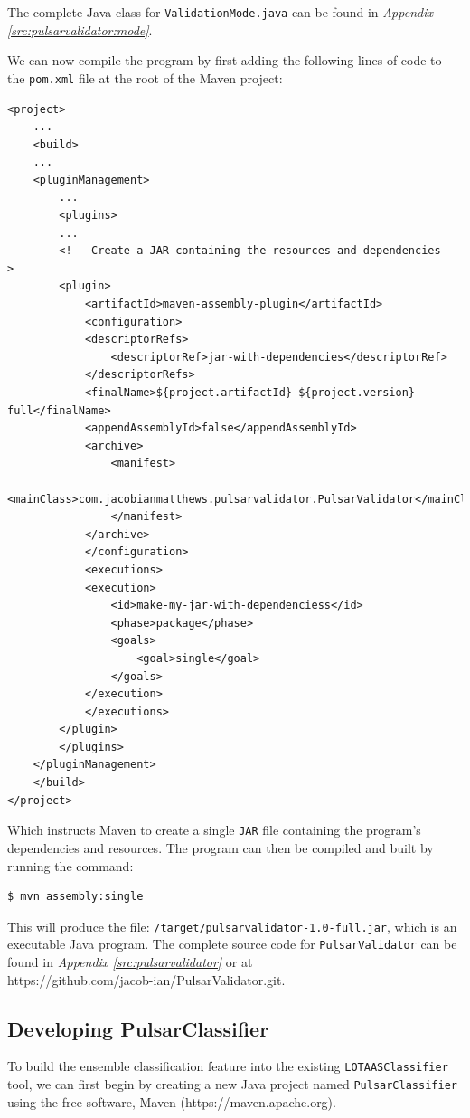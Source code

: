 \documentclass{article}
\begin{document}
\begin{appendices}
\begin{subappendices}
        The complete Java class for \verb|ValidationMode.java| can be found in \emph{Appendix \ref{src:pulsarvalidator:mode}}.
        
        We can now compile the program by first adding the following lines of code to the \verb|pom.xml| file at the root of the Maven project:
        
        \begin{lstlisting}[numbers=none, title=pom.xml]
<project>
    ...
    <build>
    ...
    <pluginManagement>
        ...
        <plugins>
        ...
        <!-- Create a JAR containing the resources and dependencies -->
        <plugin>
            <artifactId>maven-assembly-plugin</artifactId>
            <configuration>
            <descriptorRefs>
                <descriptorRef>jar-with-dependencies</descriptorRef>
            </descriptorRefs>
            <finalName>${project.artifactId}-${project.version}-full</finalName>
            <appendAssemblyId>false</appendAssemblyId>
            <archive>
                <manifest>
                <mainClass>com.jacobianmatthews.pulsarvalidator.PulsarValidator</mainClass>
                </manifest>
            </archive>
            </configuration>
            <executions>
            <execution>
                <id>make-my-jar-with-dependenciess</id>
                <phase>package</phase>
                <goals>
                    <goal>single</goal>
                </goals>
            </execution>
            </executions>
        </plugin>
        </plugins>
    </pluginManagement>
    </build>
</project>
        \end{lstlisting}
        
        Which instructs Maven to create a single \verb|JAR| file containing the program's dependencies and resources. The program can then be compiled and built by running the command:
        
        \begin{lstlisting}[numbers=none]
$ mvn assembly:single
        \end{lstlisting}
        
        This will produce the file: \verb|/target/pulsarvalidator-1.0-full.jar|, which is an executable Java program. The complete source code for \verb|PulsarValidator| can be found in \emph{Appendix \ref{src:pulsarvalidator}} or at \\https://github.com/jacob-ian/PulsarValidator.git.

        \subsection{Developing PulsarClassifier}
        \label{apndx:pulsarclassifier}
        To build the ensemble classification feature into the existing \verb|LOTAASClassifier| tool, we can first begin by creating a new Java project named \verb|PulsarClassifier| using the free software, Maven (https://maven.apache.org).


\end{subappendices}
\end{appendices}
\end{document}
